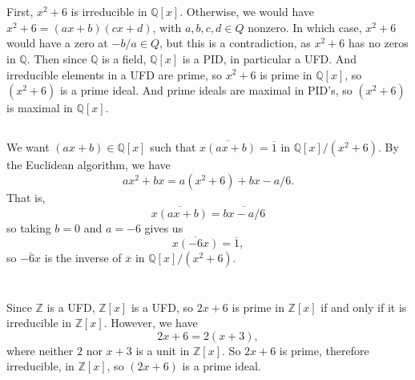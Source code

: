 \documentclass[12pt]{article}
\theoremstyle{definition}
\newcommand{\Z}{\mathbb{Z}}
\newcommand{\Q}{\mathbb{Q}}
\newcommand{\eqc}{\overline}
\begin{document}
\newpage
\section{}

\subsection{}

First, $x^2 + 6$ is irreducible in $\Q[x]$. Otherwise, we would have $x^2 + 6 = (ax + b)(cx + d)$, with $a, b, c, d \in Q$ nonzero. In which case, $x^2 + 6$ would have a zero at $-b/a \in Q$, but this is a contradiction, as $x^2 + 6$ has no zeros in $\Q$. Then since $\Q$ is a field, $\Q[x]$ is a PID, in particular a UFD. And irreducible elements in a UFD are prime, so $x^2 + 6$ is prime in $\Q[x]$, so $(x^2 + 6)$ is a prime ideal. And prime ideals are maximal in PID's, so $(x^2 + 6)$ is maximal in $\Q[x]$.

\subsection{}

We want $(ax + b) \in \Q[x]$ such that $\eqc{x(ax + b)} = \eqc{1}$ in $\Q[x]/(x^2 + 6)$. By the Euclidean algorithm, we have
\[
    ax^2 + bx = a(x^2 + 6) + bx - a/6. 
\]
That is,
\[
    \eqc{x(ax + b)} = \eqc{bx - a/6}
\]
so taking $b = 0$ and $a = -6$ gives us
\[
    \eqc{x(-6x)} = \eqc{1},
\]
so $\eqc{-6x}$ is the inverse of $\eqc{x}$ in $\Q[x]/(x^2 + 6)$.



\newpage

\section{}

\subsection{}

Since $\Z$ is a UFD, $\Z[x]$ is a UFD, so $2x + 6$ is prime in $\Z[x]$ if and only if it is irreducible in $\Z[x]$. However, we have
\[
    2x + 6 = 2(x+3),
\]
where neither $2$ nor $x + 3$ is a unit in $\Z[x]$. So $2x + 6$ is prime, therefore irreducible, in $\Z[x]$, so $(2x + 6)$ is a prime ideal.


\subsection{}
\end{document}
